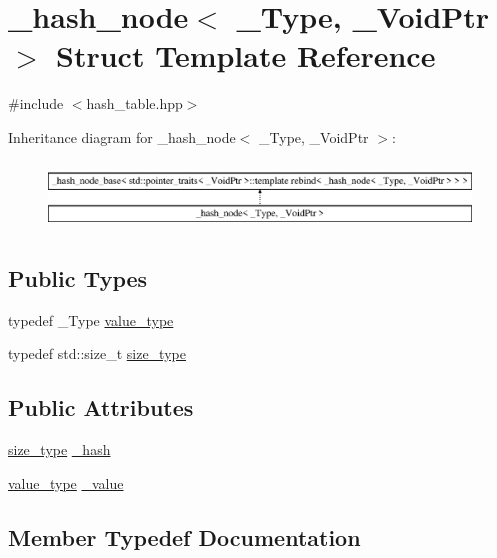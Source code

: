\hypertarget{struct__hash__node}{}\section{\+\_\+hash\+\_\+node$<$ \+\_\+\+Type, \+\_\+\+Void\+Ptr $>$ Struct Template Reference}
\label{struct__hash__node}


{\ttfamily \#include $<$hash\+\_\+table.\+hpp$>$}

Inheritance diagram for \+\_\+hash\+\_\+node$<$ \+\_\+\+Type, \+\_\+\+Void\+Ptr $>$\+:\begin{figure}[H]
\begin{center}
\leavevmode
\includegraphics[height=1.812298cm]{struct__hash__node}
\end{center}
\end{figure}
\subsection*{Public Types}
\begin{DoxyCompactItemize}
\item 
typedef \+\_\+\+Type \hyperlink{struct__hash__node_a9cf761f744b825cd8d029b23e987278e}{value\+\_\+type}
\item 
typedef std\+::size\+\_\+t \hyperlink{struct__hash__node_ab8640749cb597dcdad8e375118aea949}{size\+\_\+type}
\end{DoxyCompactItemize}
\subsection*{Public Attributes}
\begin{DoxyCompactItemize}
\item 
\hyperlink{struct__hash__node_ab8640749cb597dcdad8e375118aea949}{size\+\_\+type} \hyperlink{struct__hash__node_a76441125881a6d5bf9366d60edf2f0ab}{\+\_\+hash}
\item 
\hyperlink{struct__hash__node_a9cf761f744b825cd8d029b23e987278e}{value\+\_\+type} \hyperlink{struct__hash__node_a5a7003f35790918c985be19c537cd464}{\+\_\+value}
\end{DoxyCompactItemize}


\subsection{Member Typedef Documentation}
\hypertarget{struct__hash__node_ab8640749cb597dcdad8e375118aea949}{}
